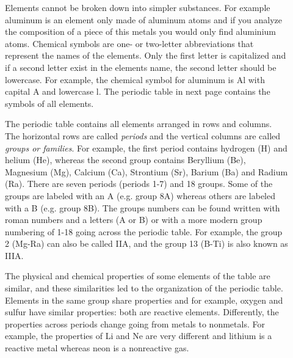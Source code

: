 \documentclass[main.tex]{subfiles}
\newcommand\chapterlabel{table}
\begin{document}
\sloppy
\begin{description}
\item[] Elements cannot be broken down into simpler substances. For example aluminum is an element only made of aluminum atoms and if you analyze the composition of a piece of this metals you would only find aluminium atoms. Chemical symbols are one- or two-letter abbreviations that represent the names of the elements. Only the first letter is capitalized and if a second letter exist in the element\textquotesingle s name, the second letter should be lowercase. For example, the chemical symbol for aluminum is Al with capital A and lowercase l. The periodic table in next page contains the symbols of all elements.

\item[] The periodic table contains all elements arranged in rows and columns. The horizontal rows are called \emph{periods} and the vertical columns are called  \emph{groups or families}. For example, the  first period contains hydrogen (H) and helium (He), whereas the second group contains Beryllium (Be), Magnesium (Mg), Calcium (Ca), Strontium (Sr), Barium (Ba) and Radium (Ra). There are seven periods (periods 1-7) and 18 groups. Some of the groups are labeled with an A (e.g. group 8A) whereas others are labeled with a B (e.g. group 8B). The groups numbers can be found written with roman numbers and a letters (A or B) or with a more modern group numbering of 1-18 going across the periodic table. For example, the group 2 (Mg-Ra) can also be called IIA, and the group 13 (B-Ti) is also known as IIIA.

\item[] The physical and chemical properties of some elements of the table are similar, and these similarities led to the organization of the periodic table. Elements in the same group share properties and for example, oxygen and sulfur have similar properties: both are reactive elements. Differently, the properties across periods change going from metals to nonmetals. For example, the properties of Li and Ne are very different and lithium is a reactive metal whereas neon is a nonreactive gas.


     \label{Fig:{\chapterlabel}\thefigurenewcounter}
    

\end{description}
\end{document}
